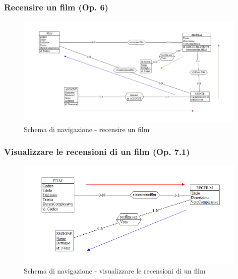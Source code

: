 \documentclass[a4paper,12pt]{report}
\begin{document}
	\subsubsection{Recensire un film (Op. 6)}
	\begin{figure}[H]
		\centering
		\includegraphics[width=450pt]{ER/navigazione/recensionefilm.png}
		\caption{Schema di navigazione - recensire un film}
	\end{figure}
	
	\subsubsection{Visualizzare le recensioni di un film (Op. 7.1)}
	\begin{figure}[H]
		\centering
		\includegraphics[width=450pt]{ER/navigazione/visualrecensionifilm.png}
		\caption{Schema di navigazione - visualizzare le recensioni di un film}
	\end{figure}
\end{document}
